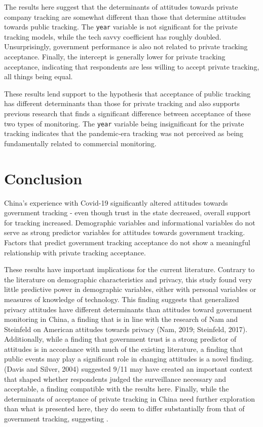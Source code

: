 \documentclass[
  letterpaper,
  DIV=11,
  numbers=noendperiod]{scrartcl}
\begin{document}
The results here suggest that the determinants of attitudes towards
private company tracking are somewhat different than those that
determine attitudes towards public tracking. The \texttt{year} variable
is not significant for the private tracking models, while the tech savvy
coefficient has roughly doubled. Unsurprisingly, government performance
is also not related to private tracking acceptance. Finally, the
intercept is generally lower for private tracking acceptance, indicating
that respondents are less willing to accept private tracking, all things
being equal.

These results lend support to the hypothesis that acceptance of public
tracking has different determinants than those for private tracking and
also supports previous research that finds a significant difference
between acceptance of these two types of monitoring. The \texttt{year}
variable being insignificant for the private tracking indicates that the
pandemic-era tracking was not perceived as being fundamentally related
to commercial monitoring.

\section{Conclusion}\label{sec-conclusion}

China's experience with Covid-19 significantly altered attitudes towards
government tracking - even though trust in the state decreased, overall
support for tracking increased. Demographic variables and informational
variables do not serve as strong predictor variables for attitudes
towards government tracking. Factors that predict government tracking
acceptance do not show a meaningful relationship with private tracking
acceptance.

These results have important implications for the current literature.
Contrary to the literature on demographic characteristics and privacy,
this study found very little predictive power in demographic variables,
either with personal variables or measures of knowledge of technology.
This finding suggests that generalized privacy attitudes have different
determinants than attitudes toward government monitoring in China, a
finding that is in line with the research of Nam and Steinfeld on
American attitudes towards privacy (Nam, 2019; Steinfeld, 2017).
Additionally, while a finding that government trust is a strong
predictor of attitudes is in accordance with much of the existing
literature, a finding that public events may play a significant role in
changing attitudes is a novel finding. (Davis and Silver, 2004)
suggested 9/11 may have created an important context that shaped whether
respondents judged the surveillance necessary and acceptable, a finding
compatible with the results here. Finally, while the determinants of
acceptance of private tracking in China need further exploration than
what is presented here, they do seem to differ substantially from that
of government tracking, suggesting .
\end{document}
